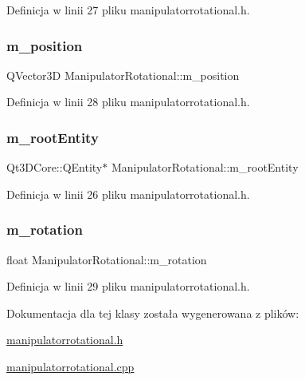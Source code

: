 Definicja w linii 27 pliku manipulatorrotational.\+h.

\mbox{\label{class_manipulator_rotational_a18221f06199833851af9eebd9a6ca438}} 
\subsubsection{\texorpdfstring{m\+\_\+position}{m\_position}}
{\footnotesize\ttfamily Q\+Vector3D Manipulator\+Rotational\+::m\+\_\+position\hspace{0.3cm}{\ttfamily [protected]}}



Definicja w linii 28 pliku manipulatorrotational.\+h.

\mbox{\label{class_manipulator_rotational_a826543721395f9b5b7faa57caebe9a08}} 
\subsubsection{\texorpdfstring{m\+\_\+root\+Entity}{m\_rootEntity}}
{\footnotesize\ttfamily Qt3\+D\+Core\+::\+Q\+Entity$\ast$ Manipulator\+Rotational\+::m\+\_\+root\+Entity\hspace{0.3cm}{\ttfamily [protected]}}



Definicja w linii 26 pliku manipulatorrotational.\+h.

\mbox{\label{class_manipulator_rotational_a6edaea6ee8740b4a517f49f65ddf229d}} 
\subsubsection{\texorpdfstring{m\+\_\+rotation}{m\_rotation}}
{\footnotesize\ttfamily float Manipulator\+Rotational\+::m\+\_\+rotation\hspace{0.3cm}{\ttfamily [protected]}}



Definicja w linii 29 pliku manipulatorrotational.\+h.



Dokumentacja dla tej klasy została wygenerowana z plików\+:\begin{DoxyCompactItemize}
\item 
\hyperlink{manipulatorrotational_8h}{manipulatorrotational.\+h}\item 
\hyperlink{manipulatorrotational_8cpp}{manipulatorrotational.\+cpp}\end{DoxyCompactItemize}
